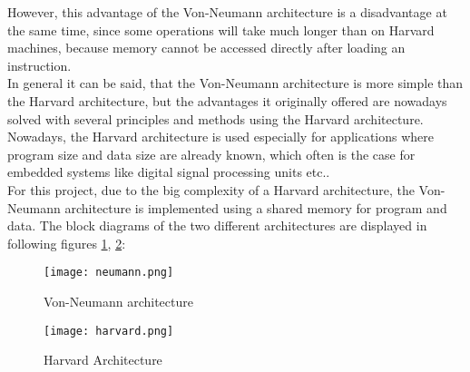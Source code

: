 However, this advantage of the Von-Neumann architecture is a disadvantage at the same time, since some operations will take much longer than on Harvard machines, because memory cannot be accessed directly after loading an instruction.\\
In general it can be said, that the Von-Neumann architecture is more simple than the Harvard architecture, but the advantages it originally offered are nowadays solved with several principles and methods using the Harvard architecture. Nowadays, the Harvard architecture is used especially for applications where program size and data size are already known, which often is the case for embedded systems like digital signal processing units etc..\\
For this project, due to the big complexity of a Harvard architecture, the Von-Neumann architecture is implemented using a shared memory for program and data. \cite{hellmann2013}
The block diagrams of the two different architectures are displayed in following figures \ref{fig:neumann}, \ref{fig:harvard}:
\begin{figure}[h]
	\centering
	\texttt{[image: neumann.png]}
	\caption{Von-Neumann architecture \cite{hellmann2013}}
	\label{fig:neumann}
\end{figure}

\begin{figure}[h]
	\centering
	\texttt{[image: harvard.png]}
	\caption{Harvard Architecture \cite{hellmann2013}}
	\label{fig:harvard}
\end{figure}



